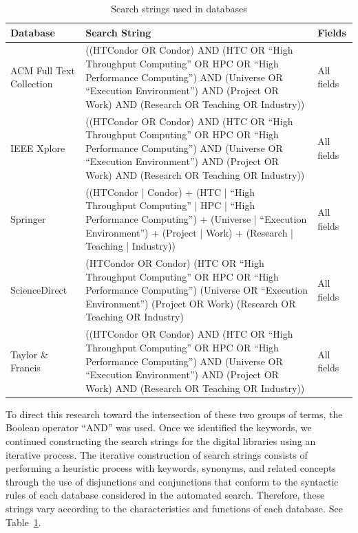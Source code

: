 \begin{table}[ht]
    \renewcommand{\arraystretch}{1.3}
    \centering
	\caption{Search strings used in databases}
	\begin{tabular}{p{2.5cm}p{11cm}p{1.5cm}}
        \hline
        \textbf{Database} & \textbf{Search String} & \textbf{Fields} \\
		\hline
        ACM Full Text \hbox{Collection} & ((HTCondor OR Condor) AND (HTC OR ``High Throughput Computing'' OR HPC OR ``High Performance Computing'') AND (Universe OR ``Execution Environment'') AND (Project OR Work) AND (Research OR Teaching OR Industry)) & All fields      \\
        IEEE Xplore                     & ((HTCondor OR Condor) AND (HTC OR ``High Throughput Computing'' OR HPC OR ``High Performance Computing'') AND (Universe OR ``Execution Environment'') AND (Project OR Work) AND (Research OR Teaching OR Industry)) & All fields      \\
        Springer                        & ((HTCondor | Condor) + (HTC | ``High Throughput Computing'' | HPC | ``High Performance Computing'') + (Universe | ``Execution Environment'') + (Project | Work) + (Research | Teaching | Industry))                 & All fields      \\
        ScienceDirect                   & (HTCondor OR Condor) (HTC OR ``High Throughput Computing'' OR HPC OR ``High Performance Computing'') (Universe OR ``Execution Environment'') (Project OR Work) (Research OR Teaching OR Industry)                   & All fields      \\
        Taylor \& Francis               & ((HTCondor OR Condor) AND (HTC OR ``High Throughput Computing'' OR HPC OR ``High Performance Computing'') AND (Universe OR ``Execution Environment'') AND (Project OR Work) AND (Research OR Teaching OR Industry)) & All fields      \\
		\hline
    \end{tabular}
	\label{table:cadenas_de_busqueda}
\end{table}


To direct this research toward the intersection of these two groups of terms, the Boolean operator ``AND'' was used. Once we identified the keywords, we continued constructing the search strings for the digital libraries using an iterative process. The iterative construction of search strings consists of performing a heuristic process with keywords, synonyms, and related concepts through the use of disjunctions and conjunctions that conform to the syntactic rules of each database considered in the automated search. Therefore, these strings vary according to the characteristics and functions of each database. See Table~\ref{table:cadenas_de_busqueda}.

